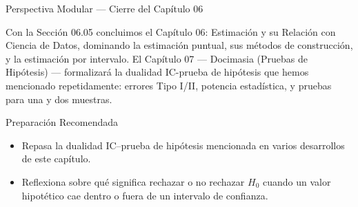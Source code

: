 \documentclass[10pt, aspectratio=169]{beamer}
\begin{document}
\begin{frame}{Perspectiva Modular --- Cierre del Capítulo 06}
  \scriptsize
  \begin{retoclase}
    Con la Sección 06.05 concluimos el Capítulo 06: Estimación y su Relación con Ciencia de Datos, dominando la estimación puntual, sus métodos de construcción, y la estimación por intervalo. El Capítulo 07 --- Docimasia (Pruebas de Hipótesis) --- formalizará la dualidad IC-prueba de hipótesis que hemos mencionado repetidamente: errores Tipo I/II, potencia estadística, y pruebas para una y dos muestras.
  \end{retoclase}

  \vspace{0.08cm}
  \pause
  \begin{alertblock}{Preparación Recomendada}
    \begin{itemize}\itemsep=0.06cm
      \item Repasa la dualidad IC--prueba de hipótesis mencionada en varios desarrollos de este capítulo.
      \item Reflexiona sobre qué significa rechazar o no rechazar $H_0$ cuando un valor hipotético cae dentro o fuera de un intervalo de confianza.
    \end{itemize}
  \end{alertblock}
\end{frame}
\end{document}
